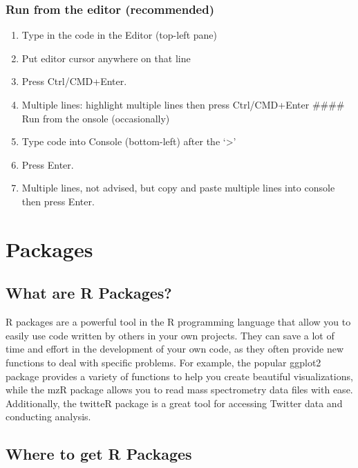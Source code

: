 \documentclass[
]{book}
\providecommand{\tightlist}{%
  \setlength{\itemsep}{0pt}\setlength{\parskip}{0pt}}
\begin{document}
\hypertarget{run-from-the-editor-recommended}{%
\subsubsection{Run from the editor (recommended)}\label{run-from-the-editor-recommended}}

\begin{enumerate}
\def\labelenumi{\arabic{enumi}.}
\tightlist
\item
  Type in the code in the Editor (top-left pane)
\item
  Put editor cursor anywhere on that line
\item
  Press Ctrl/CMD+Enter.
\item
  Multiple lines: highlight multiple lines then press Ctrl/CMD+Enter \#\#\#\# Run from the onsole (occasionally)
\item
  Type code into Console (bottom-left) after the `\textgreater{}'
\item
  Press Enter.
\item
  Multiple lines, not advised, but copy and paste multiple lines into console then press Enter.
\end{enumerate}

\hypertarget{packages}{%
\section{Packages}\label{packages}}

\hypertarget{what-are-r-packages}{%
\subsection{What are R Packages?}\label{what-are-r-packages}}

R packages are a powerful tool in the R programming language that allow you to easily use code written by others in your own projects. They can save a lot of time and effort in the development of your own code, as they often provide new functions to deal with specific problems. For example, the popular ggplot2 package provides a variety of functions to help you create beautiful visualizations, while the mzR package allows you to read mass spectrometry data files with ease. Additionally, the twitteR package is a great tool for accessing Twitter data and conducting analysis.

\hypertarget{where-to-get-r-packages}{%
\subsection{Where to get R Packages}\label{where-to-get-r-packages}}
\end{document}
